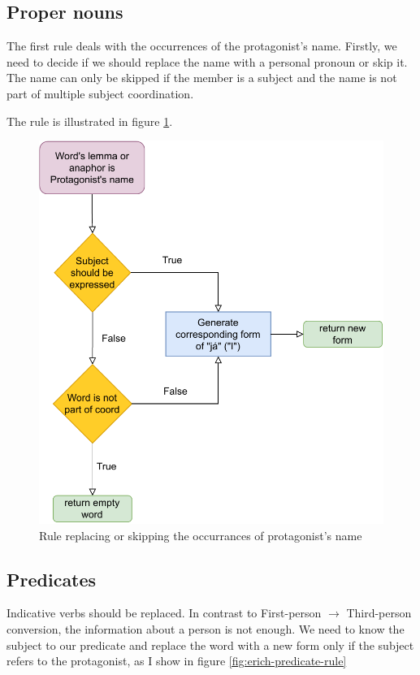 \subsection{Proper nouns}

The first rule deals with the occurrences of the protagonist's name. Firstly, we need to decide if we should replace the name with a personal pronoun or skip it. The name can only be skipped if the member is a subject and the name is not part of multiple subject coordination.

The rule is illustrated in figure \ref{fig:erich-name-rule}.

\begin{figure}[!htbp]
\includegraphics[width=\textwidth]{data/Erich-Name-Rule.pdf}
\caption{Rule replacing or skipping the occurrances of protagonist's name}
\label{fig:erich-name-rule}
\end{figure}

\subsection{Predicates}

Indicative verbs should be replaced. In contrast to First-person $\rightarrow$ Third-person conversion, the information about a person is not enough. We need to know the subject to our predicate and replace the word with a new form only if the subject refers to the protagonist, as I show in figure \ref{fig:erich-predicate-rule}

